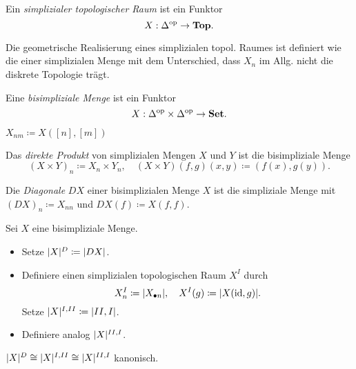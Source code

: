 \documentclass{cheat-sheet}
\begin{document}
\begin{defn}
  Ein \emph{simplizialer topologischer Raum} ist ein Funktor
  \[ X : \Delta^{\mathrm{op}} \to \mathbf{Top}. \]
\end{defn}

\begin{bem}
  Die geometrische Realisierung eines simplizialen topol. Raumes ist definiert wie die einer simplizialen Menge mit dem Unterschied, dass $X_n$ im Allg. nicht die diskrete Topologie trägt.
\end{bem}

\begin{defn}
  Eine \emph{bisimpliziale Menge} ist ein Funktor
  \[ X : \Delta^{\mathrm{op}} \times \Delta^{\mathrm{op}} \to \mathbf{Set}. \]
\end{defn}

\begin{nota}
  $X_{nm} \coloneqq X([n],[m])$
\end{nota}

\begin{bsp}
  Das \emph{direkte Produkt} von simplizialen Mengen $X$ und $Y$ ist die bisimpliziale Menge
  \[
    (X \times Y)_n \coloneqq X_n \times Y_n, \quad
    (X \times Y)(f, g)(x, y) \coloneqq (f(x), g(y)).
  \]
\end{bsp}

\begin{defn}
  Die \emph{Diagonale} $DX$ einer bisimplizialen Menge $X$ ist die simpliziale Menge mit
  $(DX)_n \coloneqq X_{nn}$ und $DX(f) \coloneqq X(f, f)$.
\end{defn}

\begin{defn}
  Sei $X$ eine bisimpliziale Menge.
  \begin{itemize}
    \item Setze $\lvert X\rvert^D \coloneqq \lvert DX\rvert$.
    \item Definiere einen simplizialen topologischen Raum $X^I$ durch
    \[ X^I_n \coloneqq \lvert X_{\bullet n}\rvert, \quad X^I(g) \coloneqq \lvert X(\operatorname{id}, g)\rvert. \]
    Setze $\lvert X\rvert^{I,II} \coloneqq \lvert II,I\rvert$.
    \item Definiere analog $\lvert X\rvert^{II,I}$.
  \end{itemize}
\end{defn}

\begin{satz}
  $\lvert X\rvert^D \cong \lvert X\rvert^{I,II} \cong \lvert X\rvert^{II,I}$ kanonisch.
\end{satz}
\end{document}
